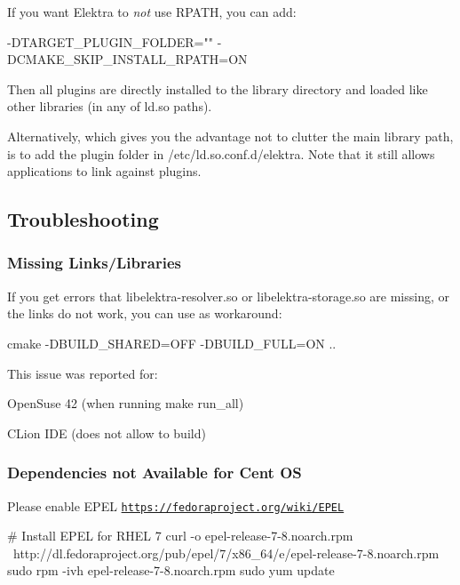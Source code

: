 If you want Elektra to {\itshape not} use {\ttfamily R\+P\+A\+TH}, you can add\+: \begin{DoxyVerb}    -DTARGET_PLUGIN_FOLDER="" -DCMAKE_SKIP_INSTALL_RPATH=ON
\end{DoxyVerb}


Then all plugins are directly installed to the library directory and loaded like other libraries (in any of {\ttfamily ld.\+so} paths).

Alternatively, which gives you the advantage not to clutter the main library path, is to add the plugin folder in {\ttfamily /etc/ld.so.\+conf.\+d/elektra}. Note that it still allows applications to link against plugins.

\subsection*{Troubleshooting}

\subsubsection*{Missing Links/\+Libraries}

If you get errors that {\ttfamily libelektra-\/resolver.\+so} or {\ttfamily libelektra-\/storage.\+so} are missing, or the links do not work, you can use as workaround\+: \begin{DoxyVerb}    cmake -DBUILD_SHARED=OFF -DBUILD_FULL=ON ..
\end{DoxyVerb}


This issue was reported for\+:


\begin{DoxyItemize}
\item Open\+Suse 42 (when running {\ttfamily make run\+\_\+all})
\item C\+Lion I\+DE (does not allow to build)
\end{DoxyItemize}

\subsubsection*{Dependencies not Available for Cent OS}

Please enable E\+P\+EL \href{https://fedoraproject.org/wiki/EPEL}{\tt https\+://fedoraproject.\+org/wiki/\+E\+P\+EL} \begin{DoxyVerb}    # Install EPEL for RHEL 7
    curl -o epel-release-7-8.noarch.rpm \
      http://dl.fedoraproject.org/pub/epel/7/x86_64/e/epel-release-7-8.noarch.rpm
    sudo rpm -ivh epel-release-7-8.noarch.rpm
    sudo yum update
\end{DoxyVerb}


